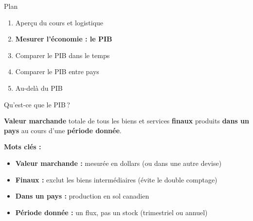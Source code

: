 \documentclass[aspectratio=169]{beamer}
\begin{document}
\begin{frame}{Plan}
   \begin{enumerate}
      \setlength\itemsep{0.5cm}
      \item {\color{gray!50}Aperçu du cours et logistique}
      \item \textbf{Mesurer l'économie : le PIB}
      \item Comparer le PIB dans le temps
      \item Comparer le PIB entre pays
      \item Au-delà du PIB
   \end{enumerate}
\end{frame}


\begin{frame}{Qu'est-ce que le PIB\,?}\examtag
   \begin{defbox}
      \textbf{Valeur marchande} totale de tous les biens et services \textbf{finaux} produits \textbf{dans un pays} au cours d'une \textbf{période donnée}.
   \end{defbox}
   \vspace{0.3cm}
   \textbf{Mots clés :}
   \vspace{0.15cm}
   \begin{itemize}
      \setlength\itemsep{0.15cm}
      \item \textbf{Valeur marchande :} mesurée en dollars (ou dans une autre devise)
      \item \textbf{Finaux :} exclut les biens intermédiaires (évite le double comptage)
      \item \textbf{Dans un pays :} production en sol canadien
      \item \textbf{Période donnée :} un flux, pas un stock (trimestriel ou annuel)
   \end{itemize}
\end{frame}
\end{document}
